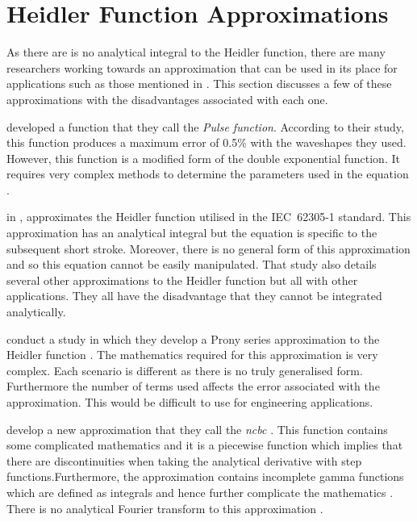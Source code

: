 
\section{Heidler Function Approximations}
\label{sec:background_approximations}
As there are is no analytical integral to the Heidler function, there are many researchers working towards an approximation that can be used in its place for applications such as those mentioned in . This section discusses a few of these approximations with the disadvantages associated with each one.

\citeauthor{ZhangFeizhouandLiuShanghe2002} developed a function that they call the \textit{Pulse function}. According to their study, this function produces a maximum error of 0.5\% with the waveshapes they used. However, this function is a modified form of the double exponential function. It requires very complex methods to determine the parameters used in the equation \cite{ZhangFeizhouandLiuShanghe2002}.

\citeauthor{Heidler2002} in \cite{Heidler2002}, approximates the Heidler function utilised in the IEC~62305-1 standard. This approximation has an analytical integral but the equation is specific to the subsequent short stroke. Moreover, there is no general form of this approximation and so this equation cannot be easily manipulated. That study also details several other approximations to the Heidler function but all with other applications. They all have the disadvantage that they cannot be integrated analytically.

\citeauthor{Delfino2012} conduct a study in which they develop a Prony series approximation to the Heidler function \cite{Delfino2012}. The mathematics required for this approximation is very complex. Each scenario is different as there is no truly generalised form. Furthermore the number of terms used affects the error associated with the approximation. This would be difficult to use for engineering applications.

\citeauthor{Javor2011} develop a new approximation that they call the \textit{\gls{ncbc}} \cite{Javor2011,Javor2012}. This function contains some complicated mathematics and it is a piecewise function which implies that there are discontinuities when taking the analytical derivative with step functions.Furthermore, the approximation contains incomplete gamma functions which are defined as integrals and hence further complicate the mathematics \cite{Gautschi:1979:CPI}. There is no analytical Fourier transform to this approximation \cite{Javor}.

